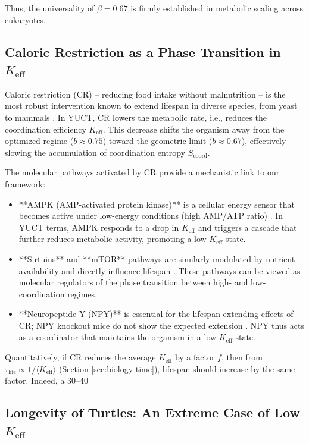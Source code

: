 \documentclass[11pt]{article}
\newcommand{\Keff}{K_{\mathrm{eff}}}
\begin{document}
	Thus, the universality of \(\beta = 0.67\) is firmly established in metabolic scaling across eukaryotes.
	
	\subsection{Caloric Restriction as a Phase Transition in \(\Keff\)}
	
	Caloric restriction (CR) – reducing food intake without malnutrition – is the most robust intervention known to extend lifespan in diverse species, from yeast to mammals \cite{Masoro2005, Fontana2010}. In YUCT, CR lowers the metabolic rate, i.e., reduces the coordination efficiency \(\Keff\). This decrease shifts the organism away from the optimized regime (\(b \approx 0.75\)) toward the geometric limit (\(b \approx 0.67\)), effectively slowing the accumulation of coordination entropy \(S_{\mathrm{coord}}\).
	
	The molecular pathways activated by CR provide a mechanistic link to our framework:
	\begin{itemize}
		\item **AMPK (AMP-activated protein kinase)** is a cellular energy sensor that becomes active under low-energy conditions (high AMP/ATP ratio) \cite{Hardie2012}. In YUCT terms, AMPK responds to a drop in \(\Keff\) and triggers a cascade that further reduces metabolic activity, promoting a low-\(\Keff\) state.
		\item **Sirtuins** and **mTOR** pathways are similarly modulated by nutrient availability and directly influence lifespan \cite{Fontana2010}. These pathways can be viewed as molecular regulators of the phase transition between high- and low-coordination regimes.
		\item **Neuropeptide Y (NPY)** is essential for the lifespan-extending effects of CR; NPY knockout mice do not show the expected extension \cite{Minor2021}. NPY thus acts as a coordinator that maintains the organism in a low-\(\Keff\) state.
	\end{itemize}
	
	Quantitatively, if CR reduces the average \(\Keff\) by a factor \(f\), then from \(\tau_{\text{life}} \propto 1/\langle \Keff \rangle\) (Section \ref{sec:biology-time}), lifespan should increase by the same factor. Indeed, a 30–40%
	
	\subsection{Longevity of Turtles: An Extreme Case of Low \(\Keff\)}
	
\end{document}
